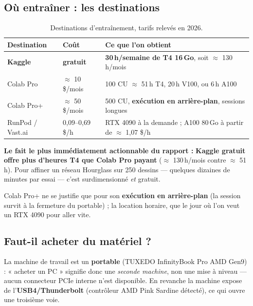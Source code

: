 \documentclass[11pt,a4paper]{article}
\newcommand{\aretenir}[1]{%
  \par\medskip
  \noindent\colorbox{encadre}{%
    \begin{minipage}{\dimexpr\linewidth-2\fboxsep}
      \vspace{2pt}#1\vspace{2pt}
    \end{minipage}}%
  \par\medskip
}
\begin{document}
\subsection{Où entraîner : les destinations}
\label{sec:destinations}

\begin{table}[h]
\centering
\small
\begin{tabularx}{\textwidth}{llY}
\toprule
\textbf{Destination} & \textbf{Coût} & \textbf{Ce que l'on obtient} \\
\midrule
\textbf{Kaggle} & \textbf{gratuit} &
\textbf{30\,h/semaine de T4 16\,Go}, soit $\approx$ 130\,h/mois \\
\addlinespace
Colab Pro & $\approx$ 10 \$/mois &
100 CU $\approx$ 51\,h T4, 20\,h V100, ou 6\,h A100 \\
\addlinespace
Colab Pro+ & $\approx$ 50 \$/mois &
500 CU, \textbf{exécution en arrière-plan}, sessions longues \\
\addlinespace
RunPod / Vast.ai & 0,09--0,69 \$/h &
RTX 4090 à la demande ; A100 80\,Go à partir de $\approx$ 1,07 \$/h \\
\bottomrule
\end{tabularx}
\caption{Destinations d'entraînement, tarifs relevés en 2026.}
\end{table}

\aretenir{\textbf{Le fait le plus immédiatement actionnable du rapport :}
\textbf{Kaggle gratuit offre plus d'heures T4 que Colab Pro payant}
($\approx$ 130\,h/mois contre $\approx$ 51\,h). Pour affiner un réseau Hourglass
sur 250 dessins — quelques dizaines de minutes par essai — c'est surdimensionné
\emph{et} gratuit.}

Colab Pro+ ne se justifie que pour son \textbf{exécution en arrière-plan} (la
session survit à la fermeture du portable) ; la location horaire, que le jour où
l'on veut un RTX 4090 pour aller vite.

\subsection{Faut-il acheter du matériel ?}
\label{sec:materiel}

La machine de travail est un \textbf{portable} (TUXEDO InfinityBook Pro AMD
Gen9) : « acheter un PC » signifie donc une \emph{seconde machine}, non une mise
à niveau — aucun connecteur PCIe interne n'est disponible. En revanche la machine
expose de l'\textbf{USB4/Thunderbolt} (contrôleur AMD Pink Sardine détecté), ce
qui ouvre une troisième voie.
\end{document}
